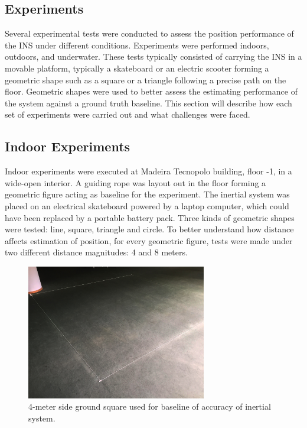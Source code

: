 
\subsection{Experiments}
\label{sub:experiments}

Several experimental tests were conducted to assess the position performance of the INS under different conditions. Experiments were performed indoors, outdoors, and underwater. These tests typically consisted of carrying the INS in a movable platform, typically a skateboard or an electric scooter forming a geometric shape such as a square or a triangle following a precise path on the floor. Geometric shapes were used to better assess the estimating performance of the system against a ground truth baseline. This section will describe how each set of experiments were carried out and what challenges were faced.

\subsection{Indoor Experiments}

Indoor experiments were executed at Madeira Tecnopolo building, floor -1, in a wide-open interior. A guiding rope was layout out in the floor forming a geometric figure acting as baseline for the experiment. The inertial system was placed on an electrical skateboard powered by a laptop computer, which could have been replaced by a portable battery pack. Three kinds of geometric shapes were tested: line, square, triangle and circle. To better understand how distance affects estimation of position, for every geometric figure, tests were made under two different distance magnitudes: 4 and 8 meters.

\begin{figure}[!h]
    \centering
    \includegraphics[width=0.7\textwidth]{figures/indoor.jpg}
    \caption{4-meter side ground square used for baseline of accuracy of inertial system.}
    \label{fig:indoor_square}
\end{figure}

